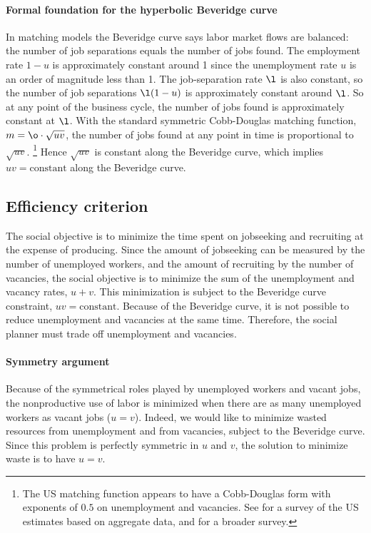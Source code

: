 \documentclass[letterpaper,12pt,leqno]{article}
\begin{document}
\paragraph{Formal foundation for the hyperbolic Beveridge curve} In matching models the Beveridge curve says labor market flows are balanced: the number of job separations equals the number of jobs found. The employment rate $1-u$ is approximately constant around 1 since the unemployment rate $u$ is an order of magnitude less than 1. The job-separation rate $\l$ is also constant, so the number of job separations $\l (1-u)$ is approximately constant around $\l$. So at any point of the business cycle, the number of jobs found is approximately constant at $\l$.  With the standard symmetric Cobb-Douglas matching function, $m = \o \cdot\sqrt{uv}$, the number of jobs found at any point in time is proportional to $\sqrt{uv}$. \footnote{The US matching function appears to have a Cobb-Douglas form with exponents of $0.5$ on unemployment and vacancies. See \citet[p. 9]{MS16} for a survey of the US estimates based on aggregate data, and \citet{PP01} for a broader survey.} Hence $\sqrt{uv}$ is constant along the Beveridge curve, which implies $uv = \text{constant}$ along the Beveridge curve.

\subsection{Efficiency criterion}

The social objective is to minimize the time spent on jobseeking and recruiting at the expense of producing. Since the amount of jobseeking can be measured by the number of unemployed workers, and the amount of recruiting by the number of vacancies, the social objective is to minimize the sum of the unemployment and vacancy rates, $u + v$. This minimization is subject to the Beveridge curve constraint, $u v = \text{constant}$. Because of the Beveridge curve, it is not possible to reduce unemployment and vacancies at the same time. Therefore, the social planner must trade off unemployment and vacancies. 

\paragraph{Symmetry argument} Because of the symmetrical roles played by unemployed workers and vacant jobs, the nonproductive use of labor is minimized when there are as many unemployed workers as vacant jobs ($u = v$). Indeed, we would like to minimize wasted resources from unemployment and from vacancies, subject to the Beveridge curve.  Since this problem is perfectly symmetric in $u$ and $v$, the solution to minimize waste is to have $u = v$.
\end{document}
